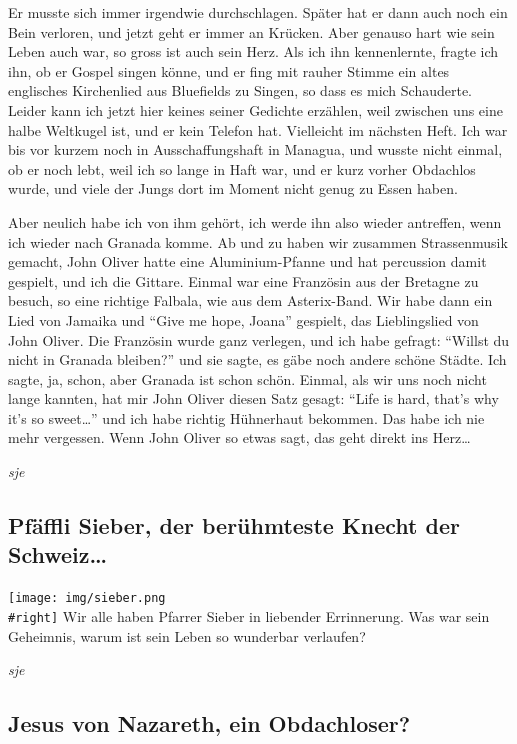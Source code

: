 \documentclass[
]{article}
\begin{document}
Er musste sich immer irgendwie durchschlagen. Später hat er dann auch
noch ein Bein verloren, und jetzt geht er immer an Krücken. Aber genauso
hart wie sein Leben auch war, so gross ist auch sein Herz. Als ich ihn
kennenlernte, fragte ich ihn, ob er Gospel singen könne, und er fing mit
rauher Stimme ein altes englisches Kirchenlied aus Bluefields zu Singen,
so dass es mich Schauderte. Leider kann ich jetzt hier keines seiner
Gedichte erzählen, weil zwischen uns eine halbe Weltkugel ist, und er
kein Telefon hat. Vielleicht im nächsten Heft. Ich war bis vor kurzem
noch in Ausschaffungshaft in Managua, und wusste nicht einmal, ob er
noch lebt, weil ich so lange in Haft war, und er kurz vorher Obdachlos
wurde, und viele der Jungs dort im Moment nicht genug zu Essen haben.

Aber neulich habe ich von ihm gehört, ich werde ihn also wieder
antreffen, wenn ich wieder nach Granada komme. Ab und zu haben wir
zusammen Strassenmusik gemacht, John Oliver hatte eine Aluminium-Pfanne
und hat percussion damit gespielt, und ich die Gittare. Einmal war eine
Französin aus der Bretagne zu besuch, so eine richtige Falbala, wie aus
dem Asterix-Band. Wir habe dann ein Lied von Jamaika und ``Give me hope,
Joana'' gespielt, das Lieblingslied von John Oliver. Die Französin wurde
ganz verlegen, und ich habe gefragt: ``Willst du nicht in Granada
bleiben?'' und sie sagte, es gäbe noch andere schöne Städte. Ich sagte,
ja, schon, aber Granada ist schon schön. Einmal, als wir uns noch nicht
lange kannten, hat mir John Oliver diesen Satz gesagt: ``Life is hard,
that's why it's so sweet\ldots{}'' und ich habe richtig Hühnerhaut
bekommen. Das habe ich nie mehr vergessen. Wenn John Oliver so etwas
sagt, das geht direkt ins Herz\ldots{}

\emph{sje}

\hypertarget{pfuxe4ffli-sieber-der-beruxfchmteste-knecht-der-schweiz}{%
\subsection{Pfäffli Sieber, der berühmteste Knecht der
Schweiz\ldots{}}\label{pfuxe4ffli-sieber-der-beruxfchmteste-knecht-der-schweiz}}

\texttt{[image: img/sieber.png\\\#right]} Wir alle haben Pfarrer Sieber in
liebender Errinnerung. Was war sein Geheimnis, warum ist sein Leben so
wunderbar verlaufen?

\emph{sje}

\hypertarget{jesus-von-nazareth-ein-obdachloser}{%
\subsection{Jesus von Nazareth, ein
Obdachloser?}\label{jesus-von-nazareth-ein-obdachloser}}
\end{document}
